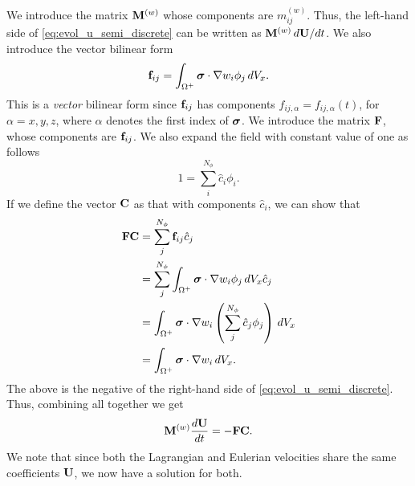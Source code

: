 \documentclass[11pt]{article}
\begin{document}
We introduce the matrix $\mathbf{M}^{(w)}$ whose components are $m_{ij}^{(w)}$. Thus, the left-hand side of \cref{eq:evol_u_semi_discrete} can be written as $\mathbf{M}^{(w)} \, d\mathbf{U} / dt$.
We also introduce the vector bilinear form
\begin{equation}
    \mathbf{f}_{ij} = \int_{\Omega^+} \bm \sigma \cdot \nabla w_i \phi_j \, dV_x.
\end{equation}
This is a \textit{vector} bilinear form since $\mathbf{f}_{ij}$ has components $f_{ij,\alpha} = f_{ij,\alpha}(t)$, for $\alpha = x,y,z$, where $\alpha$ denotes the first index of $\bm \sigma$. We introduce the matrix $\mathbf{F}$, whose components are $\mathbf{f}_{ij}$. We also expand the field with constant value of one as follows
\begin{equation}
    1 = \sum_i^{N_\phi} \hat{c}_i \phi_i.
\end{equation}
If we define the vector $\mathbf{C}$ as that with components $\hat{c}_i$, we can show that 
\begin{align}
    \mathbf{F} \mathbf{C} &= \sum_j^{N_\phi} \mathbf{f}_{ij} \hat{c}_j \nonumber \\
    &= \sum_j^{N_\phi} \int_{\Omega^+} \bm \sigma \cdot \nabla w_i \phi_j \, dV_x \hat{c}_j \nonumber \\
    &= \int_{\Omega^+} \bm \sigma \cdot \nabla w_i \left ( \sum_j^{N_\phi} \hat{c}_j \phi_j \right ) \, dV_x \nonumber \\
    &= \int_{\Omega^+} \bm \sigma \cdot \nabla w_i \, dV_x.
\end{align}
The above is the negative of the right-hand side of \cref{eq:evol_u_semi_discrete}. Thus, combining all together we get
\begin{equation}
    \mathbf{M}^{(w)} \frac{d\mathbf{U}}{dt} = -\mathbf{F} \mathbf{C}.
\end{equation}
We note that since both the Lagrangian and Eulerian velocities share the same coefficients $\mathbf{U}$, we now have a solution for both.

\end{document}
